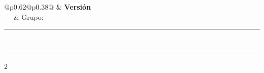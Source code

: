 \documentclass[10pt]{article}
\makeatletter
\newcommand{\myID}{\@ID}
\newcommand{\myDate}{\@Date}
\newcommand{\myTitulo}{\@Titulo}
\newcommand{\myInstitucion}{\@Institucion}
\newcommand{\mySesion}{\ifx\@Sesion\@empty\else\ \textperiodcentered\ \@Sesion\fi}
\makeatother
\begin{document}
{\sffamily
\noindent\begin{tabular}{@{}p{}@{}p{}@{}}
\textbf{\myInstitucion} & \hfill\textbf{Versión \myID}\\
\textbf{\myTitulo}\mySesion{} \textperiodcentered{} \myDate & \hfill Grupo: \rule{2.5cm}{0.3pt}\\[3mm]
\end{tabular}\par\medskip\hrule\medskip}

\begin{multicols}{2}
\begin{enumerate}


\end{enumerate}
\end{multicols}

\clearpage
\ifodd\value{page}\else\thispagestyle{empty}\null\clearpage\fi
\end{document}
